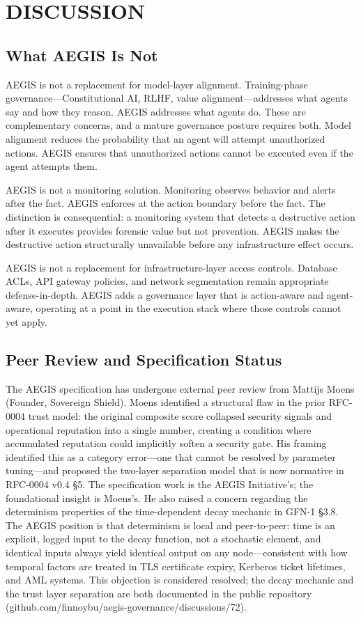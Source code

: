 \documentclass{IEEEcsmag}
\begin{document}
\section{DISCUSSION}

\subsection{What AEGIS Is Not}

AEGIS is not a replacement for model-layer alignment. Training-phase governance---Constitutional AI, RLHF, value alignment---addresses what agents say and how they reason. AEGIS addresses what agents do. These are complementary concerns, and a mature governance posture requires both. Model alignment reduces the probability that an agent will attempt unauthorized actions. AEGIS ensures that unauthorized actions cannot be executed even if the agent attempts them.

AEGIS is not a monitoring solution. Monitoring observes behavior and alerts after the fact. AEGIS enforces at the action boundary before the fact. The distinction is consequential: a monitoring system that detects a destructive action after it executes provides forensic value but not prevention. AEGIS makes the destructive action structurally unavailable before any infrastructure effect occurs.

AEGIS is not a replacement for infrastructure-layer access controls. Database ACLs, API gateway policies, and network segmentation remain appropriate defense-in-depth. AEGIS adds a governance layer that is action-aware and agent-aware, operating at a point in the execution stack where those controls cannot yet apply.

\subsection{Peer Review and Specification Status}

The AEGIS specification has undergone external peer review from Mattijs Moens (Founder, Sovereign Shield). Moens identified a structural flaw in the prior RFC-0004 trust model: the original composite score collapsed security signals and operational reputation into a single number, creating a condition where accumulated reputation could implicitly soften a security gate. His framing identified this as a category error---one that cannot be resolved by parameter tuning---and proposed the two-layer separation model that is now normative in RFC-0004 v0.4 \S5. The specification work is the AEGIS Initiative's; the foundational insight is Moens's. He also raised a concern regarding the determinism properties of the time-dependent decay mechanic in GFN-1 \S3.8. The AEGIS position is that determinism is local and peer-to-peer: time is an explicit, logged input to the decay function, not a stochastic element, and identical inputs always yield identical output on any node---consistent with how temporal factors are treated in TLS certificate expiry, Kerberos ticket lifetimes, and AML systems. This objection is considered resolved; the decay mechanic and the trust layer separation are both documented in the public repository (github.com/finnoybu/aegis-governance/discussions/72).
\end{document}
